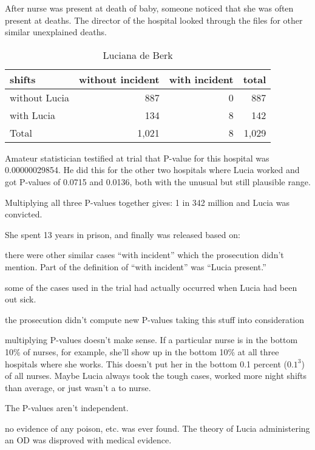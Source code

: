 \documentclass[landscape]{exam}
\begin{document}
  After nurse was present at death of baby, someone noticed that she was often
  present at deaths. The director of the hospital looked through the files for
  other similar unexplained deaths. 

  \begin{table}[H]
    \centering
    \begin{tabular}{lrrr}
      \toprule
      shifts        & without incident & with incident & total \\
      \midrule
      without Lucia & 887              & 0             & 887 \\
      with Lucia    & 134              & 8             & 142 \\
      Total         & 1,021            & 8             & 1,029 \\
      \bottomrule
    \end{tabular}
    \caption{Luciana de Berk}
    \label{tab:ldb1}
  \end{table}

  Amateur statistician testified at trial that P-value for this hospital was
  0.00000029854. He did this for the other two hospitals where Lucia worked and
  got P-values of 0.0715 and 0.0136, both with the unusual but still plausible
  range.

  Multiplying all three P-values together gives: 1 in 342 million and Lucia was
  convicted.

  She spent 13 years in prison, and finally was released based on:
  \begin{itemize*}

    \item there were other similar cases ``with incident'' which the prosecution
      didn't mention. Part of the definition of ``with incident'' was ``Lucia
      present.''

    \item some of the cases used in the trial had actually occurred when Lucia
      had been out sick.

    \item the prosecution didn't compute new P-values taking this stuff into
      consideration

    \item multiplying P-values doesn't make sense. If a particular nurse is in
      the bottom 10\% of nurses, for example, she'll show up in the bottom 10\%
      at all three hospitals where she works. This doesn't put her in the bottom
      0.1 percent ($0.1^3$) of all nurses. Maybe Lucia always took the tough
      cases, worked more night shifts than average, or just wasn't a to nurse.

      The P-values aren't independent.

    \item no evidence of any poison, etc. was ever found. The theory of Lucia
      administering an OD was disproved with medical evidence. 
  \end{itemize*}
\end{document}
